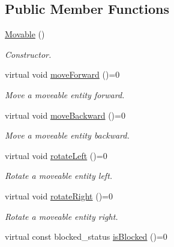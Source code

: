 \subsection*{Public Member Functions}
\begin{DoxyCompactItemize}
\item 
\hypertarget{class_movable_a053cf48796f1aef5b6f6cb4c6b22db78}{\hyperlink{class_movable_a053cf48796f1aef5b6f6cb4c6b22db78}{Movable} ()}\label{class_movable_a053cf48796f1aef5b6f6cb4c6b22db78}

\begin{DoxyCompactList}\small\item\em Constructor. \end{DoxyCompactList}\item 
\hypertarget{class_movable_adefaf61339698c5efec597529bf89310}{virtual void \hyperlink{class_movable_adefaf61339698c5efec597529bf89310}{move\+Forward} ()=0}\label{class_movable_adefaf61339698c5efec597529bf89310}

\begin{DoxyCompactList}\small\item\em Move a moveable entity forward. \end{DoxyCompactList}\item 
\hypertarget{class_movable_a9c03e7ac263902159579d7f83e9b6dee}{virtual void \hyperlink{class_movable_a9c03e7ac263902159579d7f83e9b6dee}{move\+Backward} ()=0}\label{class_movable_a9c03e7ac263902159579d7f83e9b6dee}

\begin{DoxyCompactList}\small\item\em Move a moveable entity backward. \end{DoxyCompactList}\item 
\hypertarget{class_movable_a422b71ade02b9034600f51bc55d58c90}{virtual void \hyperlink{class_movable_a422b71ade02b9034600f51bc55d58c90}{rotate\+Left} ()=0}\label{class_movable_a422b71ade02b9034600f51bc55d58c90}

\begin{DoxyCompactList}\small\item\em Rotate a moveable entity left. \end{DoxyCompactList}\item 
\hypertarget{class_movable_a821480cb8ffd047b39a907c6cf07dd84}{virtual void \hyperlink{class_movable_a821480cb8ffd047b39a907c6cf07dd84}{rotate\+Right} ()=0}\label{class_movable_a821480cb8ffd047b39a907c6cf07dd84}

\begin{DoxyCompactList}\small\item\em Rotate a moveable entity right. \end{DoxyCompactList}\item 
\hypertarget{class_movable_a40db320f27f5be1882553298677702c8}{virtual const blocked\+\_\+status \hyperlink{class_movable_a40db320f27f5be1882553298677702c8}{is\+Blocked} ()=0}\label{class_movable_a40db320f27f5be1882553298677702c8}


\end{DoxyCompactItemize}
